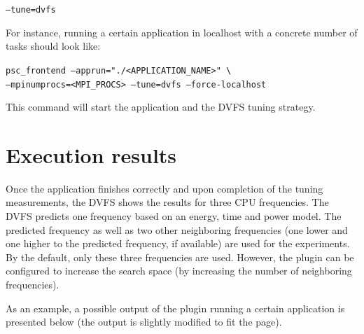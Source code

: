 \documentclass[11pt,a4paper, oneside]{book} %
\begin{document}
  \begin{center}\texttt{--tune=dvfs}\end{center}

  For instance, running a certain application in localhost with a concrete number of tasks should look like:



  \texttt{psc\_frontend --apprun="./<APPLICATION\_NAME>" \textbackslash \\ --mpinumprocs=<MPI\_PROCS> --tune=dvfs --force-localhost}

  This command will start the application and the DVFS tuning strategy. %



  \section{Execution results}

  Once the application finishes correctly and upon completion of the tuning measurements, the DVFS shows the results for three CPU frequencies.
  The DVFS predicts one frequency based on an energy, time and power model.
  The predicted frequency as well as two other neighboring frequencies (one lower and one higher to the predicted frequency, if available) are used for the experiments.
  By the default, only these three frequencies are used. However, the plugin can be configured to increase the search space (by increasing the number of neighboring frequencies).
  
  As an example, a possible output of the plugin running a certain application is presented below (the output is slightly modified to fit the page). 
  
\end{document}
